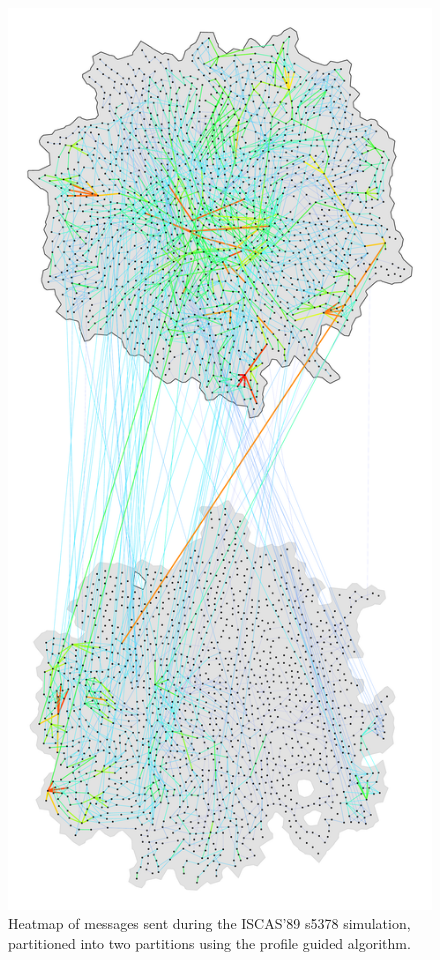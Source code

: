 \documentclass[11pt]{book}
\begin{document}
\begin{figure}
\centering
\includegraphics[width=\textwidth,height=0.9\textheight,keepaspectratio]{figs/s5378_2part}
\caption{Heatmap of messages sent during the ISCAS'89 s5378 simulation, partitioned into two partitions using the profile guided algorithm.}
\end{figure}
\end{document}

